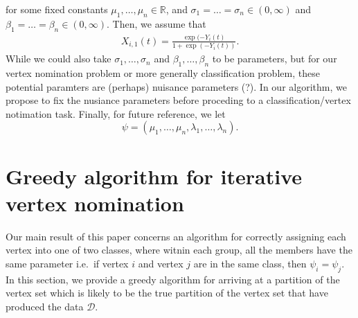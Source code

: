 \documentclass[12pt]{article}%
\begin{document}
for some fixed constants $\mu_1,\ldots, \mu_n \in \mathbb R$, and $\sigma_1 = \ldots = \sigma_n \in (0,\infty)$ and $\beta_1 = \ldots = \beta_n \in (0,\infty)$. 
Then, we assume that 
\begin{eqnarray}
X_{i,1}(t) = \frac{\exp(-Y_i(t)}{1+\exp(-Y_i(t))}.
\end{eqnarray}
While we could also take $\sigma_1,\ldots,\sigma_n$ and $\beta_1,\ldots, \beta_n$ to be parameters, 
but for our vertex nomination problem or more generally classification problem, 
these potential paramters are (perhaps) nuisance parameters (?).  
In our algorithm, we propose to fix the nusiance parameters before proceding to a classification/vertex notimation task.
Finally, for future reference, we let
$$
\psi = (\mu_1,\ldots, \mu_n,\lambda_1,\ldots,\lambda_n).
$$

\section{Greedy algorithm for iterative vertex nomination}
 
Our main result of this paper concerns an algorithm 
for correctly assigning each vertex into one of two classes, where witnin each group, all the members  
have the same parameter i.e.\ if vertex $i$ and vertex $j$ are in the same
class, then $\psi_i = \psi_j$.  
In this section, we provide a greedy algorithm for arriving at a partition 
of the vertex set which is likely to be the true partition of 
the vertex set that  have produced the data $\mathcal D$.
\end{document}

